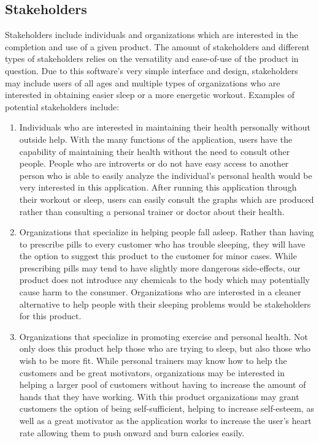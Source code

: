 \documentclass[letterpaper,english, 12pt]{scrreprt}
\begin{document}
\subsection{Stakeholders}
Stakeholders include individuals and organizations which are interested in the completion and use of a given product. The amount of stakeholders and different types of stakeholders relies on the versatility and ease-of-use of the product in question. Due to this software's very simple interface and design, stakeholders may include users of all ages and multiple types of organizations who are interested in obtaining easier sleep or a more energetic workout. Examples of potential stakeholders include:
\begin{enumerate}
	\item Individuals who are interested in maintaining their health personally without outside help. With the many functions of the application, users have the capability of maintaining their health without the need to consult other people. People who are introverts or do not have easy access to another person who is able to easily analyze the individual's personal health would be very interested in this application. After running this application through their workout or sleep, users can easily consult the graphs which are produced rather than consulting a personal trainer or doctor about their health.
	\item Organizations that specialize in helping people fall asleep. Rather than having to prescribe pills to every customer who has trouble sleeping, they will have the option to suggest this product to the customer for minor cases. While prescribing pills may tend to have slightly more dangerous side-effects, our product does not introduce any chemicals to the body which may potentially cause harm to the consumer. Organizations who are interested in a cleaner alternative to help people with their sleeping problems would be stakeholders for this product.
	\item Organizations that specialize in promoting exercise and personal health. Not only does this product help those who are trying to sleep, but also those who wish to be more fit. While personal trainers may know how to help the customers and be great motivators, organizations may be interested in helping a larger pool of customers without having to increase the amount of hands that they have working. With this product organizations may grant customers the option of being self-sufficient, helping to increase self-esteem, as well as a great motivator as the application works to increase the user's heart rate allowing them to push onward and burn calories easily.

\end{enumerate}
\end{document}
